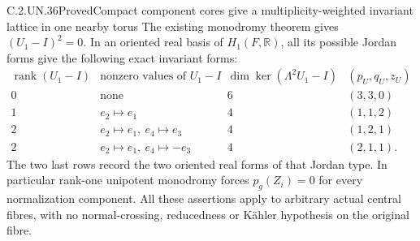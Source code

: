 \begin{statement}{C.2.UN.36}{Proved}{Compact component cores give a multiplicity-weighted invariant lattice in one nearby torus}
The existing monodromy theorem gives
$(U_1-I)^2=0$. In an oriented real basis of
$H_1(F,\mathbb R)$, all its possible Jordan forms
give the following exact invariant forms:
\[
\begin{array}{c|c|c|c}
\operatorname{rank}(U_1-I)&\text{nonzero values of }U_1-I
 &\dim\ker(\Lambda^2U_1-I)&(p_U,q_U,z_U)\\ \hline
0&\text{none}&6&(3,3,0)\\
1&e_2\mapsto e_1&4&(1,1,2)\\
2&e_2\mapsto e_1,\ e_4\mapsto e_3&4&(1,2,1)\\
2&e_2\mapsto e_1,\ e_4\mapsto-e_3&4&(2,1,1).
\end{array}                                                   \tag{C.CL.6}
\]
The two last rows record the two oriented real
forms of that Jordan type. In particular rank-one
unipotent monodromy forces $p_g(Z_i)=0$ for every
normalization component. All these assertions
apply to arbitrary actual central fibres, with
no normal-crossing, reducedness or K\"ahler
hypothesis on the original fibre.
\end{statement}

